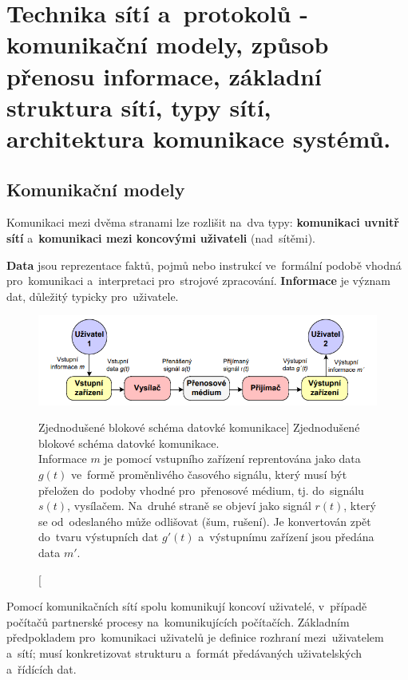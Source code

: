 \section{Technika sítí a~protokolů - komunikační modely, způsob přenosu informace, základní struktura sítí, typy sítí, architektura komunikace systémů.}
\label{q01}

\subsection{Komunikační modely}

Komunikaci mezi dvěma stranami lze rozlišit na~dva typy: \textbf{komunikaci uvnitř sítí} a~\textbf{komunikaci mezi koncovými uživateli} (nad~sítěmi).

\textbf{Data} jsou reprezentace faktů, pojmů nebo instrukcí ve~formální podobě vhodná pro~komunikaci a~interpretaci pro~strojové zpracování. \textbf{Informace} je význam dat, důležitý typicky pro~uživatele.

\begin{figure}[ht]
	\centering
	\includegraphics[width=\textwidth]{images/q01_simplified_scheme_network}
	\caption
		[Zjednodušené blokové schéma datovké komunikace]
		{Zjednodušené blokové schéma datovké komunikace. \\
		Informace $m$ je pomocí vstupního zařízení reprentována jako data $g(t)$ ve~formě proměnlivého časového signálu, který musí být přeložen do~podoby vhodné pro~přenosové médium, tj. do~signálu $s(t)$, vysílačem. Na~druhé straně se objeví jako signál $r(t)$, který se od~odeslaného může odlišovat (šum, rušení). Je konvertován zpět do~tvaru výstupních dat $g'(t)$ a~výstupnímu zařízení jsou předána data $m'$.}
	\label{q01_simplified_scheme_network}
\end{figure}

Pomocí komunikačních sítí spolu komunikují koncoví uživatelé, v~případě počítačů partnerské procesy na~komunikujících počítačích. Základním předpokladem pro~komunikaci uživatelů je definice rozhraní mezi~uživatelem a~sítí; musí konkretizovat strukturu a~formát předávaných uživatelských a~řídících dat.

